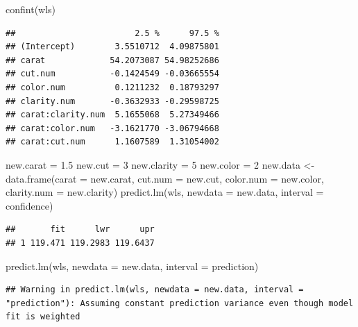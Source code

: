 \documentclass[
]{book}
\newenvironment{Shaded}{\begin{snugshade}}{\end{snugshade}}
\newcommand{\AttributeTok}[1]{\textcolor[rgb]{0.77,0.63,0.00}{#1}}
\newcommand{\DecValTok}[1]{\textcolor[rgb]{0.00,0.00,0.81}{#1}}
\newcommand{\FloatTok}[1]{\textcolor[rgb]{0.00,0.00,0.81}{#1}}
\newcommand{\FunctionTok}[1]{\textcolor[rgb]{0.00,0.00,0.00}{#1}}
\newcommand{\NormalTok}[1]{#1}
\newcommand{\OtherTok}[1]{\textcolor[rgb]{0.56,0.35,0.01}{#1}}
\newcommand{\StringTok}[1]{\textcolor[rgb]{0.31,0.60,0.02}{#1}}
\begin{document}
\begin{Shaded}
\begin{Highlighting}[]
\FunctionTok{confint}\NormalTok{(wls)}
\end{Highlighting}
\end{Shaded}

\begin{verbatim}
##                        2.5 %      97.5 %
## (Intercept)        3.5510712  4.09875801
## carat             54.2073087 54.98252686
## cut.num           -0.1424549 -0.03665554
## color.num          0.1211232  0.18793297
## clarity.num       -0.3632933 -0.29598725
## carat:clarity.num  5.1655068  5.27349466
## carat:color.num   -3.1621770 -3.06794668
## carat:cut.num      1.1607589  1.31054002
\end{verbatim}

\begin{Shaded}
\begin{Highlighting}[]
\NormalTok{new.carat }\OtherTok{=} \FloatTok{1.5}
\NormalTok{new.cut }\OtherTok{=} \DecValTok{3}
\NormalTok{new.clarity }\OtherTok{=} \DecValTok{5}
\NormalTok{new.color }\OtherTok{=} \DecValTok{2}
\NormalTok{new.data }\OtherTok{\textless{}{-}} \FunctionTok{data.frame}\NormalTok{(}\AttributeTok{carat =}\NormalTok{ new.carat, }\AttributeTok{cut.num =}\NormalTok{ new.cut, }\AttributeTok{color.num =}\NormalTok{ new.color, }\AttributeTok{clarity.num =}\NormalTok{ new.clarity)}
\FunctionTok{predict.lm}\NormalTok{(wls, }\AttributeTok{newdata =}\NormalTok{ new.data, }\AttributeTok{interval =} \StringTok{\textquotesingle{}confidence\textquotesingle{}}\NormalTok{)}
\end{Highlighting}
\end{Shaded}

\begin{verbatim}
##       fit      lwr      upr
## 1 119.471 119.2983 119.6437
\end{verbatim}

\begin{Shaded}
\begin{Highlighting}[]
\FunctionTok{predict.lm}\NormalTok{(wls, }\AttributeTok{newdata =}\NormalTok{ new.data, }\AttributeTok{interval =} \StringTok{\textquotesingle{}prediction\textquotesingle{}}\NormalTok{)}
\end{Highlighting}
\end{Shaded}

\begin{verbatim}
## Warning in predict.lm(wls, newdata = new.data, interval = "prediction"): Assuming constant prediction variance even though model fit is weighted
\end{verbatim}
\end{document}
